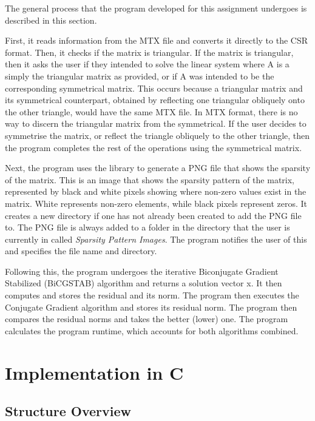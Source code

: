 \documentclass[12pt]{article}
\begin{document}
            The general process that the program developed for this assignment undergoes is described in this section. 
    
    First, it reads information from the MTX file and converts it directly to the CSR format. Then, it checks if the matrix is triangular. If the matrix is triangular, then it asks the user if they intended to solve the linear system where A is a simply the triangular matrix as provided, or if A was intended to be the corresponding symmetrical matrix. This occurs because a triangular matrix and its symmetrical counterpart, obtained by reflecting one triangular obliquely onto the other triangle, would have the same MTX file. In MTX format, there is no way to discern the triangular matrix from the symmetrical. If the user decides to symmetrise the matrix, or reflect the triangle obliquely to the other triangle, then the program completes the rest of the operations using the symmetrical matrix.

    Next, the program uses the  library to generate a PNG file that shows the sparsity of the matrix. This is an image that shows the sparsity pattern of the matrix, represented by black and white pixels showing where non-zero values exist in the matrix. White represents non-zero elements, while black pixels represent zeros. It creates a new directory if one has not already been created to add the PNG file to. The PNG file is always added to a folder in the directory that the user is currently in called \textit{Sparsity Pattern Images}. The program notifies the user of this and specifies the file name and directory.

    Following this, the program undergoes the iterative Biconjugate Gradient Stabilized (BiCGSTAB) algorithm and returns a solution vector x. It then computes and stores the residual and its norm. The program then executes the Conjugate Gradient algorithm and stores its residual norm. The program then compares the residual norms and takes the better (lower) one. The program calculates the program runtime, which accounts for both algorithms combined.

	\section{Implementation in C}

\subsection{Structure Overview}
 
\end{document}
